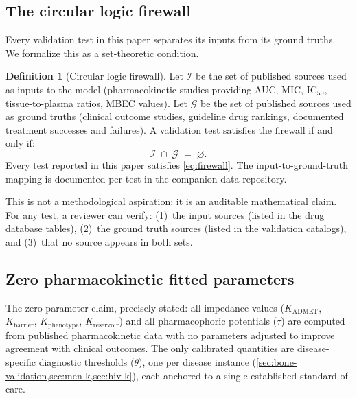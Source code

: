 \documentclass[11pt]{article}
\theoremstyle{plain}
\theoremstyle{definition}
\newtheorem{definition}[theorem]{Definition}
\newcommand{\Kbarr}{K_{\mathrm{barrier}}}
\newcommand{\Kpheno}{K_{\mathrm{phenotype}}}
\newcommand{\Kres}{K_{\mathrm{reservoir}}}
\newcommand{\Kadmet}{K_{\mathrm{ADMET}}}
\begin{document}
\subsection{The circular logic firewall}
\label{sec:firewall}

Every validation test in this paper separates its inputs from its
ground truths. We formalize this as a set-theoretic condition.

\begin{definition}[Circular logic firewall]
\label{def:firewall}
Let $\mathcal{I}$ be the set of published sources used as inputs
to the model (pharmacokinetic studies providing AUC, MIC, IC$_{50}$,
tissue-to-plasma ratios, MBEC values). Let $\mathcal{G}$ be the
set of published sources used as ground truths (clinical outcome
studies, guideline drug rankings, documented treatment successes
and failures). A validation test satisfies the firewall if and only
if:
\begin{equation}
  \label{eq:firewall}
  \mathcal{I} \;\cap\; \mathcal{G} \;=\; \varnothing.
\end{equation}
Every test reported in this paper satisfies \cref{eq:firewall}. The
input-to-ground-truth mapping is documented per test in the
companion data repository.
\end{definition}

This is not a methodological aspiration; it is an auditable
mathematical claim. For any test, a reviewer can verify: (1)~the
input sources (listed in the drug database tables), (2)~the ground
truth sources (listed in the validation catalogs), and (3)~that no
source appears in both sets.

\subsection{Zero pharmacokinetic fitted parameters}
\label{sec:zero-params}

The zero-parameter claim, precisely stated: all impedance values
($\Kadmet$, $\Kbarr$, $\Kpheno$, $\Kres$) and all pharmacophoric
potentials ($\tau$) are computed from published pharmacokinetic data
with no parameters adjusted to improve agreement with clinical
outcomes. The only calibrated quantities are disease-specific
diagnostic thresholds ($\theta$), one per disease instance
(\cref{sec:bone-validation,sec:men-k,sec:hiv-k}), each anchored to
a single established standard of care.
\end{document}
